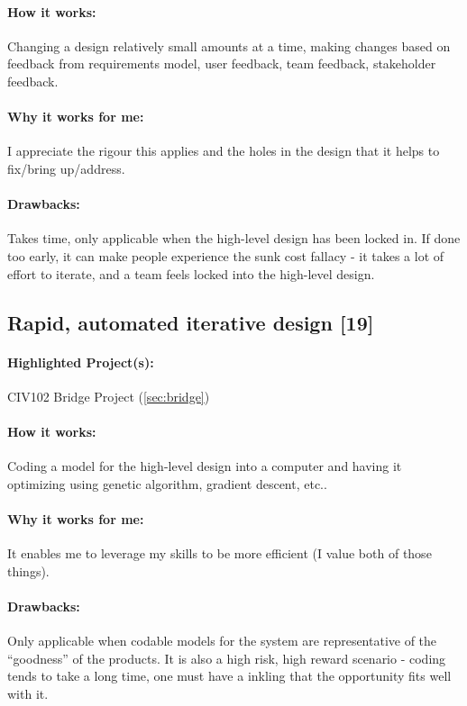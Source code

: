 \documentclass[a4paper,12pt]{article}
\begin{document}
\paragraph{How it works: }
Changing a design relatively small amounts at a time, making changes based on feedback from {requirements model, user feedback, team feedback, stakeholder feedback}.

\paragraph{Why it works for me: }
I appreciate the rigour this applies and the holes in the design that it helps to fix/bring up/address.

\paragraph{Drawbacks: }
Takes time, only applicable when the high-level design has been locked in. If done too early, it can make people experience the sunk cost fallacy - it takes a lot of effort to iterate, and a team feels locked into the high-level design.

\subsection{Rapid, automated iterative design [19]}
\label{sec:automated}
\paragraph{Highlighted Project(s): } CIV102 Bridge Project (\ref{sec:bridge})

\paragraph{How it works: }
Coding a model for the high-level design into a computer and having it optimizing using {genetic algorithm, gradient descent, etc.}.

\paragraph{Why it works for me: }
It enables me to leverage my skills to be more efficient (I value both of those things).

\paragraph{Drawbacks: }
Only applicable when codable models for the system are representative of the “goodness” of the products. It is also a high risk, high reward scenario - coding tends to take a long time, one must have a inkling that the opportunity fits well with it.
\end{document}
